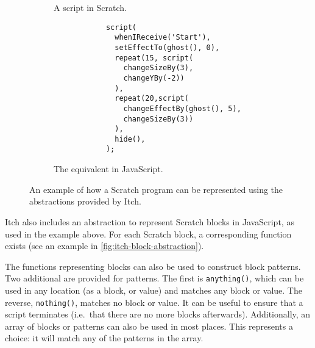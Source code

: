 \documentclass[../main]{subfiles}
\begin{document}
\begin{figure}
    \centering
    \begin{wide}
        \begin{subfigure}{0.49\linewidth}
            \begin{scratch}[scale=0.8]
                {
                }
                {
                }

            \end{scratch}
            \caption{A script in Scratch.}
        \end{subfigure}
        \begin{subfigure}{0.5\linewidth}
            \begin{verbatim}
            script(
              whenIReceive('Start'),
              setEffectTo(ghost(), 0),
              repeat(15, script(
                changeSizeBy(3),
                changeYBy(-2))
              ),
              repeat(20,script(
                changeEffectBy(ghost(), 5),
                changeSizeBy(3))
              ),
              hide(),
            );
            \end{verbatim}
            \caption{The equivalent in JavaScript.}
        \end{subfigure}
    \end{wide}
    \caption{An example of how a Scratch program can be represented using the abstractions provided by Itch.}\label{fig:itch-block-abstraction}
\end{figure}

Itch also includes an abstraction to represent Scratch blocks in JavaScript, as used in the example above.
For each Scratch block, a corresponding function exists (see an example in \vref{fig:itch-block-abstraction}).

The functions representing blocks can also be used to construct block patterns.
Two additional are provided for patterns.
The first is \texttt{anything()}, which can be used in any location (as a block, or value) and matches any block or value.
The reverse, \texttt{nothing()}, matches no block or value.
It can be useful to ensure that a script terminates (i.e.\ that there are no more blocks afterwards).
Additionally, an array of blocks or patterns can also be used in most places.
This represents a choice: it will match any of the patterns in the array.
\end{document}
